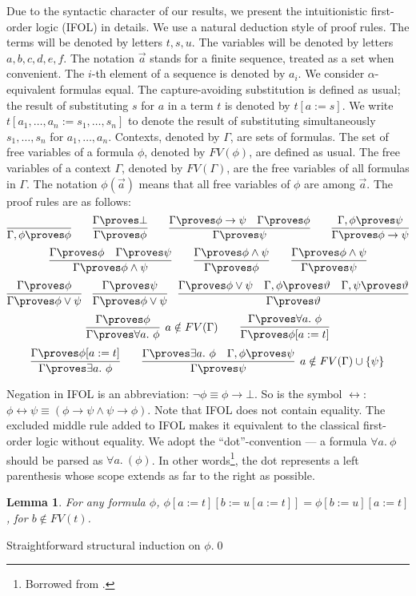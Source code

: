 \documentclass{LMCS}
\newtheorem{lemma}[thm]{Lemma}
\newcommand\iffl{\ensuremath{\leftrightarrow}}
\newcommand{\p}{\proves}
\newcommand{\g}{\Gamma}
\newcommand{\gp}{\Gamma \proves}
\begin{document}
Due to the syntactic character of our results, we present the intuitionistic first-order logic
(IFOL) in details. We use a natural deduction style of proof rules. The terms will be denoted by
letters $t, s, u$. The variables will be denoted by letters $a, b, c, d, e,
f$. The notation $\vec{a}$ stands for a finite sequence, treated as a set when
convenient. The $i$-th element of a sequence is denoted by $a_i$. We consider $\alpha$-equivalent
formulas equal. The capture-avoiding substitution is defined as usual; the
result of substituting $s$ for $a$ in a term $t$ is denoted by $t[a:=s]$. We
write $t[a_1, {\ldots} , a_n := s_1, {\ldots} , s_n]$ to denote the result
of substituting simultaneously $s_1, {\ldots} , s_n$ for $a_1, {\ldots} ,
a_n$. Contexts, denoted by $\Gamma$, are sets of formulas. 
The set of free variables of a formula $\phi$, denoted by $FV(\phi)$, are
defined as usual. The free variables of a context $\g$, denoted by $FV(\g)$, are
the free variables of all formulas in $\g$. The notation $\phi(\vec{a})$ means
that all free variables of $\phi$ are among $\vec{a}$. The proof rules are as follows:
\[
\infer{\g, \phi \p \phi}{} \qquad \infer{\gp \phi}{\gp \bot} 
\qquad
\infer{\gp \psi}{\gp \phi \to \psi & \gp \phi} \qquad \infer{\gp \phi \to \psi}{\g, \phi \p \psi}
\]
\[
\infer{\gp \phi \land \psi}{\gp \phi & \gp \psi} \qquad \infer{\gp
\phi}{\gp \phi \land \psi} \qquad \infer{\gp \psi}{\gp \phi \land \psi}
\]
\[
\infer{\gp \phi \lor \psi}{\gp \phi} \quad \infer{\gp \phi \lor
\psi}{\gp \psi} \quad
\infer{\gp \vartheta}{\gp \phi \lor \psi & \g, \phi \proves \vartheta & \g, \psi
\proves \vartheta}
\]
\[
\infer[a \notin FV(\g)]{\gp \forall a.\ \phi}{\gp  \phi} \qquad
\infer{\gp \phi[a:=t]}{\gp \forall a.\ \phi}
\]
\[
\infer{\gp \exists a.\ \phi}{\gp \phi[a:=t]} \qquad \infer[a \notin
FV(\g) \cup \{ \psi \}]{\gp \psi}{\gp \exists a.\ \phi &
\g, \phi \p \psi}
\]

Negation in IFOL is an abbreviation: $\lnot \phi \equiv \phi \to
\bot$. So is the symbol $\iffl$: $\phi \iffl \psi \equiv (\phi \to \psi \land
\psi \to \phi)$. Note that IFOL does not contain equality. The excluded middle rule added to IFOL makes it equivalent
to the classical first-order logic without equality. We adopt the
``dot''-convention --- a formula $\forall a.\ \phi$ should be parsed as
$\forall a.\ (\phi)$. In other words\footnote{Borrowed from \cite{urzy}.}, the
dot represents a left parenthesis whose scope extends as far to the right as
possible. 



\begin{lemma}\label{formsubst}
For any formula $\phi$, $\phi[a:=t][b:=u[a:=t]] = \phi[b:=u][a:=t]$, for $b \notin FV(t)$. 
\end{lemma}
\proof Straightforward structural induction on $\phi$.\qed
\end{document}
